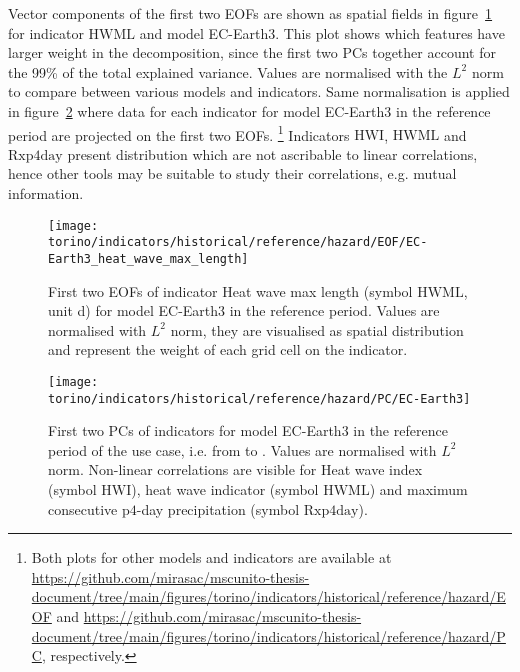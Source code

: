 Vector components of the first two \glspl{EOF} are shown as spatial fields in figure~\ref{fig:EOF_EC-Earth3_heat_wave_max_length} for indicator $\mathrm{HWML}$ and model EC-Earth3. This plot shows which features have larger weight in the decomposition, since the first two \glspl{PC} together account for the 99\% of the total explained variance. Values are normalised with the $L^2$ norm to compare between various models and indicators. Same normalisation is applied in figure~\ref{fig:PC_EC-Earth3} where data for each indicator for model EC-Earth3 in the reference period are projected on the first two \glspl{EOF}.%
\footnote{Both plots for other models and indicators are available at \url{https://github.com/mirasac/mscunito-thesis-document/tree/main/figures/torino/indicators/historical/reference/hazard/EOF} and \url{https://github.com/mirasac/mscunito-thesis-document/tree/main/figures/torino/indicators/historical/reference/hazard/PC}, respectively.}
Indicators $\mathrm{HWI}$, $\mathrm{HWML}$ and $\mathrm{Rxp4day}$ present distribution which are not ascribable to linear correlations, hence other tools may be suitable to study their correlations, e.g. mutual information.

\begin{figure}[h]
  \centering
  \texttt{[image: torino/indicators/historical/reference/hazard/EOF/EC-Earth3\_heat\_wave\_max\_length]}
  \caption{First two \glspl{EOF} of indicator {Heat wave max length} (symbol $\mathrm{HWML}$, unit \unit{\day}) for model EC-Earth3 in the reference period. Values are normalised with $L^2$ norm, they are visualised as spatial distribution and represent the weight of each grid cell on the indicator.}
  \label{fig:EOF_EC-Earth3_heat_wave_max_length}
\end{figure}

\begin{figure}[h]
  \centering
  \texttt{[image: torino/indicators/historical/reference/hazard/PC/EC-Earth3]}
  \caption{First two \glspl{PC} of indicators for model EC-Earth3 in the reference period of the use case, i.e. from  to . Values are normalised with $L^2$ norm. Non-linear correlations are visible for {Heat wave index} (symbol $\mathrm{HWI}$), heat wave indicator (symbol $\mathrm{HWML}$) and maximum consecutive $\mathrm{p4}$-day precipitation (symbol $\mathrm{Rxp4day}$).}
  \label{fig:PC_EC-Earth3}
\end{figure}

